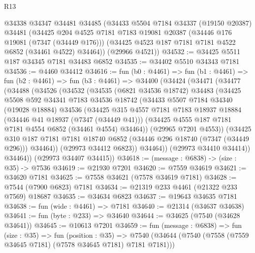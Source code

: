 \begin{lexlean}{R13}
\begin{coremodule}
    @34338
    @34347
    @34481
    @34485
    (@34433
      @5504
      @7184
      @34337
      (@19150 @20387)
      @34481
      (@34425
        @204
        @4525
        @7181
        @7183
        @19081
        @20387
        (@34446 @176 @19081 (@7347 (@34449 @176)))
        (@34425 @4523 @187 @7181 @7181 @4522 @6852 (@34461 @4522) @34464))
      (@29966 @4521))
@34532 := @34425 @5511 @187 @34345 @7181 @34483 @6852
@34535 := @34402 @5510 @34343 @7181
@34536 := @4460 @34412
@34616 := fun (b0 : @4461) =>
  fun (b1 : @4461) =>
  fun (b2 : @4461) =>
  fun (b3 : @4461) =>
  @34400
    (@34424
      (@34471
        (@34477
          (@34488
            (@34526
              (@34532
                (@34535
                  (@6821 @34536 @18742)
                  @34483
                  (@34425
                    @5508
                    @592
                    @34341
                    @7183
                    @34536
                    @18742
                    (@34433
                      @5507
                      @7184
                      @34340
                      (@19028 @18884)
                      @34536
                      (@34425
                        @315
                        @4557
                        @7181
                        @7183
                        @18937
                        @18884
                        (@34446 @41 @18937 (@7347 (@34449 @41)))
                        (@34425 @4555 @187 @7181 @7181 @4554 @6852 (@34461 @4554) @34464))
                      (@29965 @7201 @4553))
                    (@34425
                      @310
                      @187
                      @7181
                      @7181
                      @18740
                      @6852
                      (@34446 @296 @18740 (@7347 (@34449 @296)))
                      @34464))
                  (@29973 @34412 @6823))
                @34464))
            (@29973 @34410 @34414))
          @34464))
      (@29973 @34407 @34415))
@34618 := (message : @6838) -> (size : @35) -> @7536
@34619 := @21930 @7201
@34620 := @7559 @34619
@34621 := @34620 @7181
@34625 := @7558 @34621 (@7578 @34619 @7181)
@34628 := @7544 (@7900 @6823) @7181
@34634 := @21319 @233 @4461 (@21322 @233 @7569) @18687
@34635 := @34634 @6823
@34637 := @19643 @34635 @7181
@34638 := fun (wide : @4461) => @7181
@34640 := @21314 (@34637 @34638)
@34641 := fun (byte : @233) => @34640
@34644 := @34625 (@7540 (@34628 @34641))
@34645 := @10613 @7201
@34659 := fun (message : @6838) =>
  fun (size : @35) =>
  fun (position : @35) =>
  @7540 (@34644 (@7540 (@7558 (@7559 @34645 @7181) (@7578 @34645 @7181) @7181 @7181)))

\end{coremodule}
\end{lexlean}
